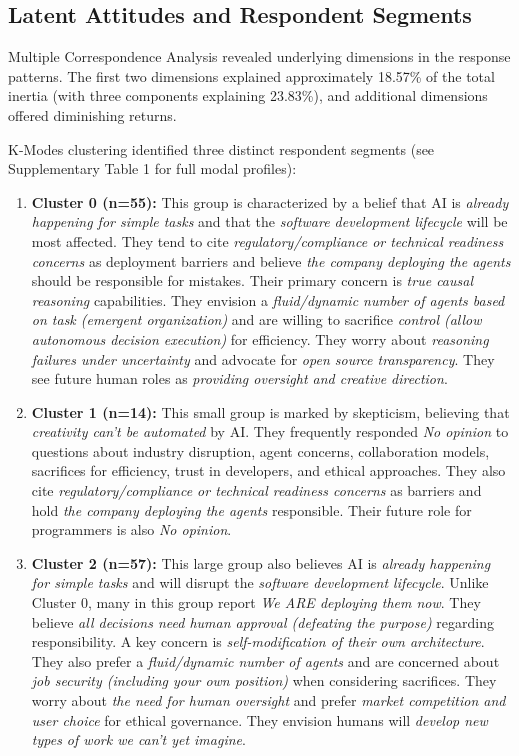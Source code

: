 \documentclass{article}
\begin{document}
\subsection{Latent Attitudes and Respondent
	Segments}\label{latent-attitudes-and-respondent-segments}

Multiple Correspondence Analysis revealed underlying dimensions in the
response patterns. The first two dimensions explained approximately 18.57\%
of the total inertia (with three components explaining 23.83\%), and additional dimensions offered diminishing
returns.

K-Modes clustering identified three distinct respondent segments (see
Supplementary Table 1 for full modal profiles):

\begin{enumerate}
	\item \textbf{Cluster 0 (n=55):} This group is characterized by a belief that AI is \textit{already happening for simple tasks} and that the \textit{software development lifecycle} will be most affected. They tend to cite \textit{regulatory/compliance or technical readiness concerns} as deployment barriers and believe \textit{the company deploying the agents} should be responsible for mistakes. Their primary concern is \textit{true causal reasoning} capabilities. They envision a \textit{fluid/dynamic number of agents based on task (emergent organization)} and are willing to sacrifice \textit{control (allow autonomous decision execution)} for efficiency. They worry about \textit{reasoning failures under uncertainty} and advocate for \textit{open source transparency}. They see future human roles as \textit{providing oversight and creative direction}.
	\item \textbf{Cluster 1 (n=14):} This small group is marked by skepticism, believing that \textit{creativity can't be automated} by AI. They frequently responded \textit{No opinion} to questions about industry disruption, agent concerns, collaboration models, sacrifices for efficiency, trust in developers, and ethical approaches. They also cite \textit{regulatory/compliance or technical readiness concerns} as barriers and hold \textit{the company deploying the agents} responsible. Their future role for programmers is also \textit{No opinion}.
	\item \textbf{Cluster 2 (n=57):} This large group also believes AI is \textit{already happening for simple tasks} and will disrupt the \textit{software development lifecycle}. Unlike Cluster 0, many in this group report \textit{We ARE deploying them now}. They believe \textit{all decisions need human approval (defeating the purpose)} regarding responsibility. A key concern is \textit{self-modification of their own architecture}. They also prefer a \textit{fluid/dynamic number of agents} and are concerned about \textit{job security (including your own position)} when considering sacrifices. They worry about \textit{the need for human oversight} and prefer \textit{market competition and user choice} for ethical governance. They envision humans will \textit{develop new types of work we can't yet imagine}.
\end{enumerate}
\end{document}
